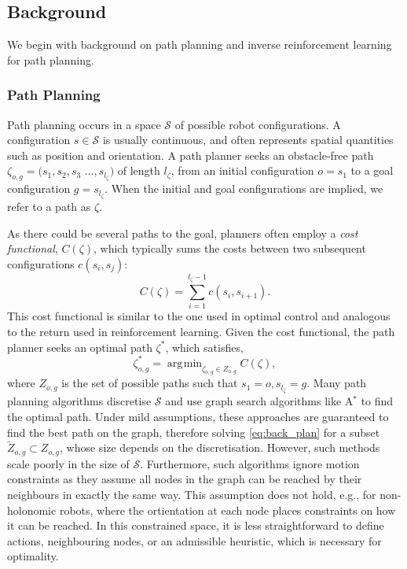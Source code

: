 \documentclass[a4paper,11pt]{report}
\DeclareMathOperator*{\argmin}{\arg\!\min}
\begin{document}
\subsection{Background}
We begin with background on path planning and inverse reinforcement learning for path planning.

\subsubsection{Path Planning \label{subsec:path_planning}}
Path planning occurs in a space $\mathcal{S}$ of possible robot configurations. A configuration $s \in \mathcal{S}$ is usually continuous, and often represents spatial quantities such as position and orientation. A path planner seeks an obstacle-free path $\zeta_{o,g} = (s_1,s_2,s_3$ $\ldots,s_{l_{\zeta}}) $ of length $l_{\zeta}$, from an initial configuration $o = s_1$ to a goal configuration  $g =s_{l_{\zeta}}$. When the initial and goal configurations are implied, we refer to a path as $\zeta$.

As there could be several paths to the goal, planners often employ a \emph{cost functional}, $C(\zeta)$, which typically sums the costs between two subsequent configurations $c(s_i,s_j)$:
\begin{equation}
	C(\zeta) = \sum_{i=1}^{l_{\zeta}-1} c(s_i,s_{i+1}).
\end{equation}
This cost functional is similar to the one used in optimal control and analogous to the return used in reinforcement learning. Given the cost functional, the path planner seeks an optimal path $\zeta^*$, which satisfies,
\begin{equation}
 	\zeta^*_{o,g} = \argmin_{\zeta_{o,g} \in Z_{o,g}} C(\zeta), \label{eq:back_plan}
\end{equation}
where $Z_{o,g}$ is the set of possible paths such that $s_1 = o, s_{l_\zeta} = g$. Many path planning algorithms discretise $\mathcal{S}$ and use graph search algorithms like A$^*$ to find the optimal path. Under mild assumptions, these approaches are guaranteed to find the best path on the graph, therefore solving \eqref{eq:back_plan} for a subset $\tilde{Z}_{o,g} \subset Z_{o,g}$, whose size depends on the discretisation. However, such methods scale poorly in the size of $\mathcal{S}$. Furthermore, such algorithms ignore motion constraints as they assume all nodes in the graph can be reached by their neighbours in exactly the same way. This assumption does not hold, e.g., for non-holonomic robots, where the ortientation at each node places constraints on how it can be reached. In this constrained space, it is less straightforward to define actions, neighbouring nodes, or an admissible heuristic, which is necessary for optimality.
\end{document}
